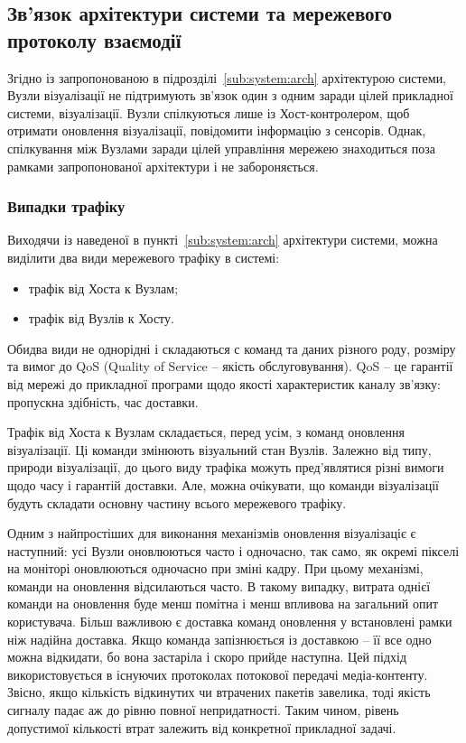 \documentclass[a4paper,ukrainian,utf8,nocolumnsxix,floatsection,equationsection]{eskdtext}
\renewcommand\paragraph{\subsubsection}
\begin{document}
\subsection{Зв’язок архітектури системи та мережевого протоколу взаємодії}

Згідно із запропонованою в підрозділі~\ref{sub:system:arch} архітектурою системи, Вузли візуалізації не підтримують зв’язок один з одним заради цілей прикладної системи, візуалізації. Вузли спілкуються лише із Хост-контролером, щоб отримати оновлення візуалізації, повідомити інформацію з сенсорів. Однак, спілкування між Вузлами заради цілей управління мережею знаходиться поза рамками запропонованої архітектури і не забороняється.

\paragraph{Випадки трафіку}
\label{par:traffic:cases}

Виходячи із наведеної в пункті~\ref{sub:system:arch} архітектури системи, можна виділити два види мережевого трафіку в системі:
\begin{itemize}
	\item трафік від Хоста к Вузлам;
	\item трафік від Вузлів к Хосту.
\end{itemize}

Обидва види не однорідні і складаються с команд та даних різного роду, розміру та вимог до QoS (Quality of Service – якість обслуговування). QoS – це гарантії від мережі до прикладної програми щодо якості характеристик каналу зв’язку: пропускна здібність, час доставки.

Трафік від Хоста к Вузлам складається, перед усім, з команд оновлення візуалізації. Ці команди змінюють візуальний стан Вузлів. Залежно від типу, природи візуалізації, до цього виду трафіка можуть пред’являтися різні вимоги щодо часу і гарантій доставки. Але, можна очікувати, що команди візуалізації будуть складати основну частину всього мережевого трафіку.

Одним з найпростіших для виконання механізмів оновлення візуалізаціє є наступний: усі Вузли оновлюються часто і одночасно, так само, як окремі пікселі на моніторі оновлюються одночасно при зміні кадру. При цьому механізмі, команди на оновлення відсилаються часто. В такому випадку, витрата однієї команди на оновлення буде менш помітна і менш впливова на загальний опит користувача. Більш важливою є доставка  команд оновлення у встановлені рамки ніж надійна доставка. Якщо команда запізнюється із доставкою – її все одно можна відкидати, бо вона застаріла і скоро прийде наступна. Цей підхід використовується в існуючих протоколах потокової передачі медіа-контенту. Звісно, якщо кількість відкинутих чи втрачених пакетів завелика, тоді якість сигналу падає аж до рівню повної непридатності. Таким чином, рівень допустимої кількості втрат залежить від конкретної прикладної задачі.
\end{document}
